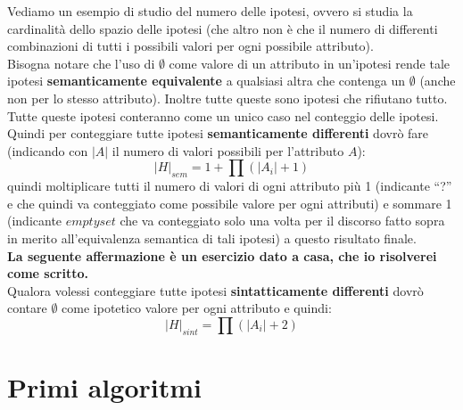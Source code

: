 \documentclass[a4paper,12pt, oneside]{book}
\begin{document}
\begin{esempio}
  Vediamo un esempio di studio del numero delle ipotesi, ovvero si studia la
  cardinalità dello spazio delle ipotesi (che altro non è che il numero di
  differenti combinazioni di tutti i possibili valori per ogni possibile
  attributo).\\
  Bisogna notare che l'uso di $\emptyset$ come valore di un attributo in
  un'ipotesi rende tale ipotesi \textbf{semanticamente equivalente} a qualsiasi
  altra che contenga un $\emptyset$ (anche non per lo stesso attributo). Inoltre
  tutte queste sono ipotesi che rifiutano tutto. Tutte queste ipotesi conteranno
  come un unico caso nel conteggio delle ipotesi.\\
  Quindi per conteggiare tutte ipotesi \textbf{semanticamente differenti} dovrò
  fare (indicando con $|A|$ il numero di valori possibili per l'attributo $A$):
  \[|H|_{sem}=1+\prod (|A_i|+1)\]
  quindi moltiplicare tutti il numero di valori di ogni attributo più 1
  (indicante ``?'' e che quindi va conteggiato come possibile valore per ogni
  attributi) e sommare 1 (indicante $emptyset$ che va conteggiato solo una volta
  per il discorso fatto sopra in merito all'equivalenza semantica di tali
  ipotesi) a questo risultato finale.\\
  \textbf{La seguente affermazione è un esercizio dato a casa, che io risolverei
  come scritto.}\\
  Qualora volessi conteggiare tutte ipotesi \textbf{sintatticamente differenti}
  dovrò contare $\emptyset$ come ipotetico valore per ogni attributo e quindi:
  \[|H|_{sint}=\prod (|A_i|+2)\]
\end{esempio}
\section{Primi algoritmi}
\end{document}
